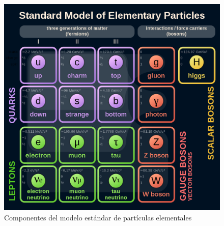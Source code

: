 \begin{figure}[h]
    \centering
    \includegraphics[scale=.25]{Images/1070px-Standard_Model_of_Elementary_Particles_dark.svg.png}
    \caption{\small Componentes del modelo estándar de partículas elementales}
    \label{fig:intro1}
\end{figure}

